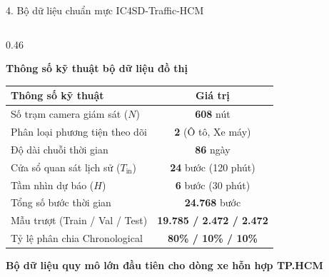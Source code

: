 \documentclass[aspectratio=169,10pt]{beamer}
\begin{document}
\begin{frame}{4. Bộ dữ liệu chuẩn mực IC4SD-Traffic-HCM}
\begin{columns}[T]
    \begin{column}{0.46\textwidth}
      \begin{block}{\textbf{Thông số kỹ thuật bộ dữ liệu đồ thị}}
        \centering
        \fontsize{6.5pt}{7.5pt}\selectfont
        \renewcommand{\arraystretch}{1.05}
        \setlength{\tabcolsep}{3pt}
        \begin{tabular}{lc}
          \toprule
          \textbf{Thông số kỹ thuật} & \textbf{Giá trị} \\
          \midrule
          Số trạm camera giám sát ($N$) & \textbf{608} nút \\
          Phân loại phương tiện theo dõi & \textbf{2} (Ô tô, Xe máy) \\
          Độ dài chuỗi thời gian & \textbf{86} ngày \\
          Cửa sổ quan sát lịch sử ($T_{\text{in}}$) & \textbf{24} bước (120 phút) \\
          Tầm nhìn dự báo ($H$) & \textbf{6} bước (30 phút) \\
          Tổng số bước thời gian & \textbf{24.768} bước \\
          Mẫu trượt (Train / Val / Test) & \textbf{19.785 / 2.472 / 2.472} \\
          Tỷ lệ phân chia Chronological & \textbf{80\% / 10\% / 10\%} \\
          \bottomrule
        \end{tabular}
      \end{block}
      \vskip 3pt
      \centering
      {\scriptsize \textbf{\textcolor{ptitgreen}{Bộ dữ liệu quy mô lớn đầu tiên cho dòng xe hỗn hợp TP.HCM}}}
    \end{column}
  \end{columns}
\end{frame}
\end{document}
